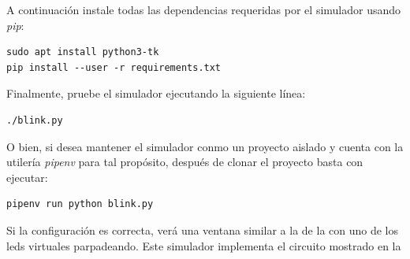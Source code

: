 \documentclass[letterpaper,10.5pt]{article}
\begin{document}
A continuación instale todas las dependencias requeridas por el simulador usando \emph{pip}:

\begin{Verbatim}[fontsize=\footnotesize]
sudo apt install python3-tk
pip install --user -r requirements.txt
\end{Verbatim}

Finalmente, pruebe el simulador ejecutando la siguiente línea:

\begin{Verbatim}[fontsize=\footnotesize]
./blink.py
\end{Verbatim}

O bien, si desea mantener el simulador conmo un proyecto aislado y cuenta con la utilería \emph{pipenv}\footnotemark{} para tal propósito, después de clonar el proyecto basta con ejecutar:

\begin{Verbatim}[fontsize=\footnotesize]
pipenv run python blink.py
\end{Verbatim}

Si la configuración es correcta, verá una ventana similar a la de la  con uno de los leds virtuales parpadeando.
Este simulador implementa el circuito mostrado en la 
\end{document}

